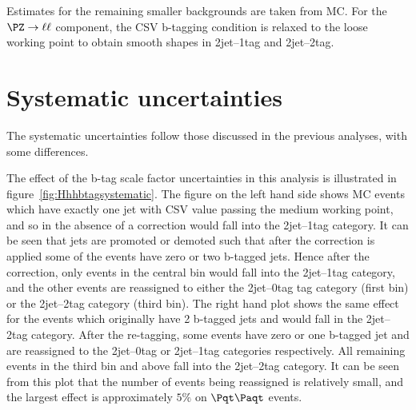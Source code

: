 Estimates for the remaining smaller backgrounds are taken from \ac{MC}. For the
$\PZ\to\ell\ell$ component, the \ac{CSV} b-tagging condition is relaxed to the
loose working point to obtain smooth shapes in 2jet--1tag and 2jet--2tag.

\section{Systematic uncertainties}
\label{sec:Hhhsystematics}

The systematic uncertainties follow those discussed in the previous analyses,
with some differences. 

The effect of the b-tag scale factor uncertainties in this analysis is
illustrated in figure~\ref{fig:Hhhbtagsystematic}. The figure on the left hand
side shows \ac{MC} events which have exactly one jet with \ac{CSV} value passing the medium
working point, and so in the absence of a correction would fall into the
2jet--1tag category. It can be seen that jets are promoted or demoted such that
after the correction is applied some of the events have zero or two b-tagged
jets. Hence after the correction, only events in the central bin would fall into
the 2jet--1tag category, and the other events are reassigned to either the
2jet--0tag tag category (first bin) or the 2jet--2tag category (third bin). The
right hand plot shows the same effect for the events which originally have 2
b-tagged jets and would fall in the 2jet--2tag category. After the re-tagging,
some events have zero or one b-tagged jet and are reassigned to the 2jet--0tag
or 2jet--1tag categories respectively. All remaining events in the third bin and
above fall into the 2jet--2tag category. It can be seen from this plot that the
number of events being reassigned is relatively small, and the largest effect is
approximately $5\%$ on $\ttbar$ events.

